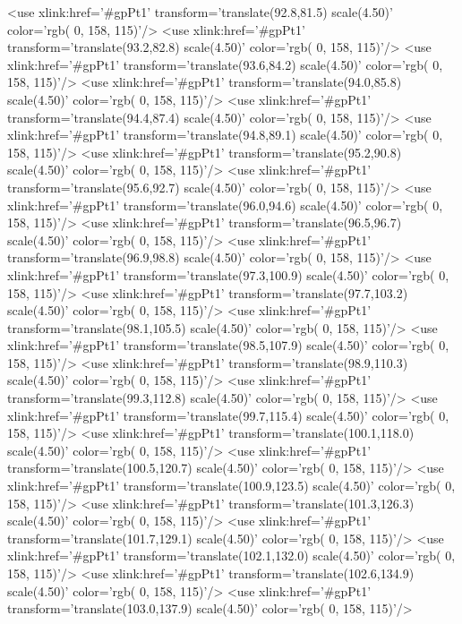 	<use xlink:href='#gpPt1' transform='translate(92.8,81.5) scale(4.50)' color='rgb(  0, 158, 115)'/>
	<use xlink:href='#gpPt1' transform='translate(93.2,82.8) scale(4.50)' color='rgb(  0, 158, 115)'/>
	<use xlink:href='#gpPt1' transform='translate(93.6,84.2) scale(4.50)' color='rgb(  0, 158, 115)'/>
	<use xlink:href='#gpPt1' transform='translate(94.0,85.8) scale(4.50)' color='rgb(  0, 158, 115)'/>
	<use xlink:href='#gpPt1' transform='translate(94.4,87.4) scale(4.50)' color='rgb(  0, 158, 115)'/>
	<use xlink:href='#gpPt1' transform='translate(94.8,89.1) scale(4.50)' color='rgb(  0, 158, 115)'/>
	<use xlink:href='#gpPt1' transform='translate(95.2,90.8) scale(4.50)' color='rgb(  0, 158, 115)'/>
	<use xlink:href='#gpPt1' transform='translate(95.6,92.7) scale(4.50)' color='rgb(  0, 158, 115)'/>
	<use xlink:href='#gpPt1' transform='translate(96.0,94.6) scale(4.50)' color='rgb(  0, 158, 115)'/>
	<use xlink:href='#gpPt1' transform='translate(96.5,96.7) scale(4.50)' color='rgb(  0, 158, 115)'/>
	<use xlink:href='#gpPt1' transform='translate(96.9,98.8) scale(4.50)' color='rgb(  0, 158, 115)'/>
	<use xlink:href='#gpPt1' transform='translate(97.3,100.9) scale(4.50)' color='rgb(  0, 158, 115)'/>
	<use xlink:href='#gpPt1' transform='translate(97.7,103.2) scale(4.50)' color='rgb(  0, 158, 115)'/>
	<use xlink:href='#gpPt1' transform='translate(98.1,105.5) scale(4.50)' color='rgb(  0, 158, 115)'/>
	<use xlink:href='#gpPt1' transform='translate(98.5,107.9) scale(4.50)' color='rgb(  0, 158, 115)'/>
	<use xlink:href='#gpPt1' transform='translate(98.9,110.3) scale(4.50)' color='rgb(  0, 158, 115)'/>
	<use xlink:href='#gpPt1' transform='translate(99.3,112.8) scale(4.50)' color='rgb(  0, 158, 115)'/>
	<use xlink:href='#gpPt1' transform='translate(99.7,115.4) scale(4.50)' color='rgb(  0, 158, 115)'/>
	<use xlink:href='#gpPt1' transform='translate(100.1,118.0) scale(4.50)' color='rgb(  0, 158, 115)'/>
	<use xlink:href='#gpPt1' transform='translate(100.5,120.7) scale(4.50)' color='rgb(  0, 158, 115)'/>
	<use xlink:href='#gpPt1' transform='translate(100.9,123.5) scale(4.50)' color='rgb(  0, 158, 115)'/>
	<use xlink:href='#gpPt1' transform='translate(101.3,126.3) scale(4.50)' color='rgb(  0, 158, 115)'/>
	<use xlink:href='#gpPt1' transform='translate(101.7,129.1) scale(4.50)' color='rgb(  0, 158, 115)'/>
	<use xlink:href='#gpPt1' transform='translate(102.1,132.0) scale(4.50)' color='rgb(  0, 158, 115)'/>
	<use xlink:href='#gpPt1' transform='translate(102.6,134.9) scale(4.50)' color='rgb(  0, 158, 115)'/>
	<use xlink:href='#gpPt1' transform='translate(103.0,137.9) scale(4.50)' color='rgb(  0, 158, 115)'/>
